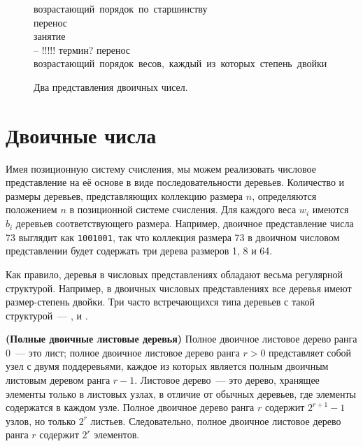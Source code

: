 \begin{figure}
  \centering
  
  \mbox{возрастающий порядок по старшинству}\\
  \mbox{перенос}\\
  \mbox{занятие}\\ -- !!!!! термин?
  \mbox{перенос}\\
  \mbox{возрастающий порядок весов, каждый из которых степень двойки}\\

  \caption{Два представления двоичных чисел.}
  \label{fig:9.1}
\end{figure}

\section{Двоичные числа}
\label{sc:9.2}

Имея позиционную систему счисления, мы можем реализовать числовое
представление на её основе в виде последовательности
деревьев. Количество и размеры деревьев, представляющих коллекцию
размера $n$, определяются положением $n$ в позиционной системе
счисления. Для каждого веса $w_i$ имеются $b_i$ деревьев
соответствующего размера. Например, двоичное представление числа 73
выглядит как \texttt{1001001}, так что коллекция размера 73 в двоичном
числовом представлении будет содержать три дерева размеров 1, 8 и 64.

Как правило, деревья в числовых представлениях обладают весьма
регулярной структурой. Например, в двоичных числовых представлениях
все деревья имеют размер-степень двойки. Три часто встречающихся типа
деревьев с такой структурой~---  \cite{KaldewaijDielissen1996},  \cite{Vuillemin1978} и
 \cite{SackStrothotte1990}.

\begin{definition}
  \textbf{(Полные двоичные листовые деревья)} Полное двоичное листовое
  дерево ранга 0~--- это лист; полное двоичное листовое дерево ранга
  $r > 0$ представляет собой узел с двумя поддеревьями, каждое из
  которых является полным двоичным листовым деревом ранга $r -
  1$. Листовое дерево~--- это дерево, хранящее элементы только в
  листовых узлах, в отличие от обычных деревьев, где элементы
  содержатся в каждом узле. Полное двоичное дерево ранга $r$ содержит
  $2^{r+1} - 1$ узлов, но только $2^r$ листьев. Следовательно, полное
  двоичное листовое дерево ранга $r$ содержит $2^r$ элементов.
\end{definition}

